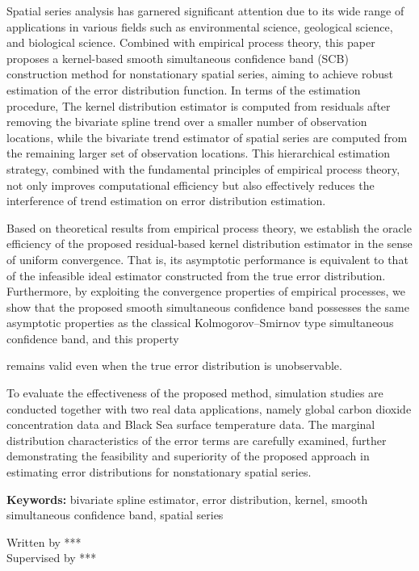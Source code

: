 Spatial series analysis has garnered significant attention due to its wide range of applications in various fields such as environmental science, geological science, and biological science. Combined with empirical process theory, this paper proposes a kernel-based smooth simultaneous confidence band (SCB) construction method for nonstationary spatial series, aiming to achieve robust estimation of the error distribution function. In terms of the estimation procedure, The kernel distribution estimator is computed from residuals after removing the bivariate spline trend over a smaller number of observation locations, while the bivariate trend estimator of spatial series are computed from the remaining larger
set of observation locations. This hierarchical estimation strategy, combined with the fundamental principles of empirical process theory, not only improves computational efficiency but also effectively reduces the interference of trend estimation on error distribution estimation.

Based on theoretical results from empirical process theory, we establish the oracle efficiency of the proposed residual-based kernel distribution estimator in the sense of uniform convergence. That is, its asymptotic performance is equivalent to that of the infeasible ideal estimator constructed from the true error distribution. Furthermore, by exploiting the convergence properties of empirical processes, we show that the proposed smooth simultaneous confidence band possesses the same asymptotic properties as the classical Kolmogorov--Smirnov type simultaneous confidence band, and this property 

\newpage %
\thispagestyle{fancy}
\noindent remains valid even when the true error distribution is unobservable.

To evaluate the effectiveness of the proposed method, simulation studies are conducted together with two real data applications, namely global carbon dioxide concentration data and Black Sea surface temperature data. The marginal distribution characteristics of the error terms are carefully examined, further demonstrating the feasibility and superiority of the proposed approach in estimating error distributions for nonstationary spatial series.

{\bf Keywords:} bivariate spline estimator, error distribution, kernel, smooth simultaneous confidence band, spatial series

\begin{flushright}
  Written by ***\\
Supervised by ***
\end{flushright}


